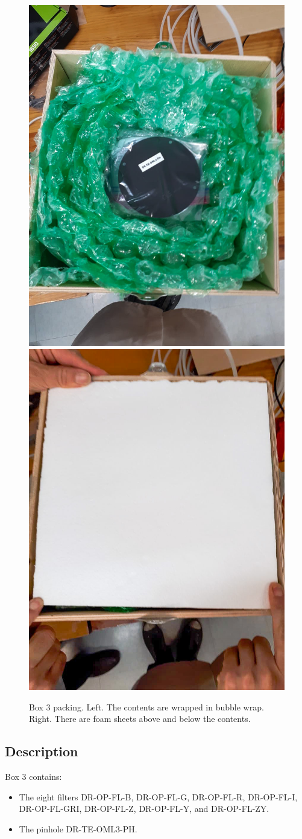 \documentclass{article}
\begin{document}
\begin{figure}[bp]
\begin{center}
\includegraphics[width=0.40\linewidth]{figures/20201209T080439.jpg}
\includegraphics[width=0.40\linewidth]{figures/20201209T080445.jpg}
\end{center}
\caption{Box 3 packing. Left. The contents are wrapped in bubble wrap. Right. There are foam sheets above and below the contents.}
\label{figure:box-three-packing}
\end{figure}

\subsection{Description}

Box 3 contains:

\begin{itemize}
\item The eight filters DR-OP-FL-B, DR-OP-FL-G, DR-OP-FL-R, DR-OP-FL-I, DR-OP-FL-GRI, DR-OP-FL-Z, DR-OP-FL-Y, and DR-OP-FL-ZY.
\item The pinhole DR-TE-OML3-PH.
\end{itemize}
\end{document}
